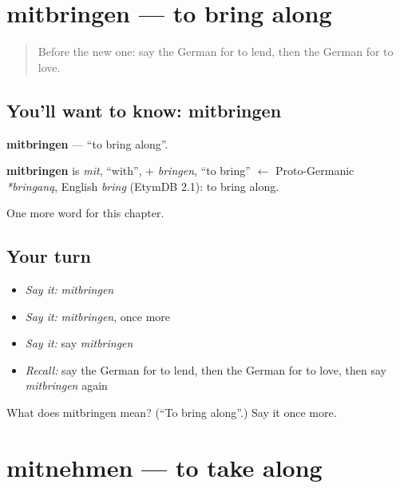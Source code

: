 \section[mitbringen]{mitbringen — to bring along}

\label{lesson:GE-C148-mitbringen}



\begin{quote}
Before the new one: say the German for to lend, then the German for to love.
\end{quote}

\subsection*{You'll want to know: mitbringen}
\textbf{mitbringen} — \textquotedblleft{}to bring along\textquotedblright{}.

\begin{cousinweb}
\textbf{mitbringen} is \emph{mit}, \textquotedblleft{}with\textquotedblright{}, + \emph{bringen}, \textquotedblleft{}to bring\textquotedblright{} $\leftarrow$ Proto-Germanic \emph{*bringaną}, English \emph{bring} (EtymDB 2.1): to bring along.
\end{cousinweb}

\begin{grammarlens}[title={What you've built}]
One more word for this chapter.
\end{grammarlens}

\subsection*{Your turn}
\begin{itemize}
\raggedright
  \item \emph{Say it:} \emph{mitbringen}
  \item \emph{Say it:} \emph{mitbringen}, once more
  \item \emph{Say it:} say \emph{mitbringen}
  \item \emph{Recall:} say the German for to lend, then the German for to love, then say \emph{mitbringen} again
\end{itemize}

\begin{tcolorbox}[breakable,colback=teal!4,colframe=teal!35!black,title={Before you move on}]
What does mitbringen mean? (\textquotedblleft{}To bring along\textquotedblright{}.) Say it once more.
\end{tcolorbox}
\section[mitnehmen]{mitnehmen — to take along}

